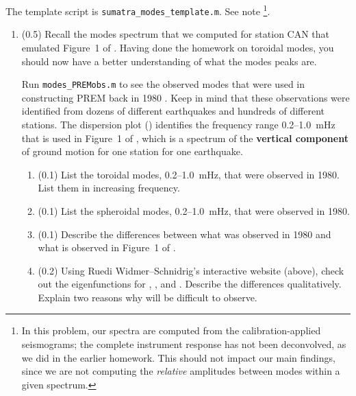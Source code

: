 \documentclass[11pt,titlepage,fleqn]{article}
\begin{document}
The template script is \verb+sumatra_modes_template.m+. See note \footnote{In this problem, our spectra are computed from the calibration-applied seismograms; the complete instrument response has not been deconvolved, as we did in the earlier homework. This should not impact our main findings, since we are not computing the {\em relative} amplitudes between modes within a given spectrum.}.

\begin{enumerate}
\item (0.5) Recall the modes spectrum that we computed for station CAN that emulated Figure~1 of \citet{Park2005}. Having done the homework on toroidal modes, you should now have a better understanding of what the modes peaks are.

Run \verb+modes_PREMobs.m+ to see the observed modes that were used in constructing PREM back in 1980 \citep{PREM}. Keep in mind that these observations were identified from dozens of different earthquakes and hundreds of different stations.
The dispersion plot () identifies the frequency range 0.2--1.0~mHz that is used in Figure~1 of \citet{Park2005}, which is a spectrum of the {\bf vertical component} of ground motion for one station for one earthquake.
%
\begin{enumerate}
\item (0.1) List the toroidal modes, 0.2--1.0~mHz, that were observed in 1980. \\
List them in increasing frequency.
\item (0.1) List the spheroidal modes, 0.2--1.0~mHz, that were observed in 1980.
\item (0.1) Describe the differences between what was observed in 1980 and what is observed in Figure~1 of \citet{Park2005}.
\item (0.2) Using Ruedi Widmer--Schnidrig's interactive website (above), check out the eigenfunctions for , , and . Describe the differences qualitatively. Explain two reasons why  will be difficult to observe.
\end{enumerate}


\end{enumerate}
\end{document}

